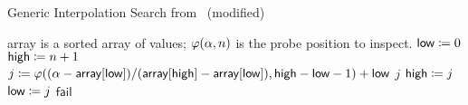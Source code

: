 \begin{algorithm}[t]
\caption{Generic Interpolation Search
    from~\cite[Page 41]{gonnet1980algorithmic} (modified)}
\label{alg:interp_search}
\begin{algorithmic}[1]
\Require \textsf{array} is a sorted array of values;
    $\varphi(\alpha, n)$ is the probe position to inspect.
    \State $\textsf{low} \coloneqq{} 0$
    \State $\textsf{high} \coloneqq{} n+1$
        \State $j \coloneqq{}
            \varphi((\alpha-\textsf{array}[\textsf{low}])/
                (\textsf{array}[\textsf{high}]-
                \textsf{array}[\textsf{low}]), 
                \textsf{high}-\textsf{low}-1) + \textsf{low}$
            \State \Return $j$
            \State $\textsf{high} \coloneqq{} j$
        \Else
            \State $\textsf{low} \coloneqq{} j$
        \EndIf
    \EndWhile
    \State \Return $\textsf{fail}$
\EndProcedure
\end{algorithmic}
\end{algorithm}
